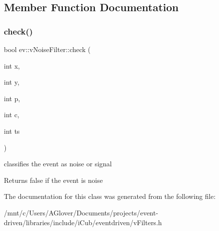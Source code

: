 \subsection{Member Function Documentation}
\mbox{\label{classev_1_1vNoiseFilter_a71ed5ded4f59d1c3180b0f5e5a021547}} 
\subsubsection{\texorpdfstring{check()}{check()}}
{\footnotesize\ttfamily bool ev\+::v\+Noise\+Filter\+::check (\begin{DoxyParamCaption}\item[{int}]{x,  }\item[{int}]{y,  }\item[{int}]{p,  }\item[{int}]{c,  }\item[{int}]{ts }\end{DoxyParamCaption})\hspace{0.3cm}{\ttfamily [inline]}}



classifies the event as noise or signal 

\begin{DoxyReturn}{Returns}
false if the event is noise 
\end{DoxyReturn}


The documentation for this class was generated from the following file\+:\begin{DoxyCompactItemize}
\item 
/mnt/c/\+Users/\+A\+Glover/\+Documents/projects/event-\/driven/libraries/include/i\+Cub/eventdriven/v\+Filters.\+h\end{DoxyCompactItemize}
